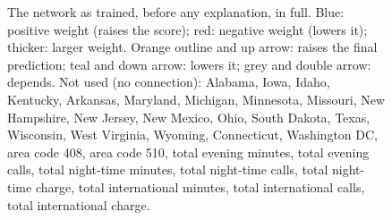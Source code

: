 \documentclass[a4paper,10pt]{article}
\newif\ifreviewmarks
\newcommand{\reviewrule}{\noindent{\color{BrickRed}\rule{\linewidth}{0.8pt}}}
\newenvironment{drafted}[1][]{%
  \ifreviewmarks\par\addvspace{\medskipamount}\reviewrule\par\nopagebreak
  \noindent{\color{BrickRed}\sffamily\footnotesize\textbf{Thesis Draft}\quad #1\hfill review}\par\nopagebreak\smallskip\fi}{%
  \ifreviewmarks\par\smallskip\noindent{\color{BrickRed}\sffamily\footnotesize end of thesis draft}\par\nopagebreak\reviewrule\par\medskip\fi}
\begin{document}
\begin{drafted}[plain-language layer: churn100-s4-c3]
\begin{landscape}
\begin{figure}[p]
{}%
\caption{The network as trained, before any explanation, in full. Blue: positive weight (raises the score); red: negative weight (lowers it); thicker: larger weight. Orange outline and up arrow: raises the final prediction; teal and down arrow: lowers it; grey and double arrow: depends. Not used (no connection): Alabama, Iowa, Idaho, Kentucky, Arkansas, Maryland, Michigan, Minnesota, Missouri, New Hampshire, New Jersey, New Mexico, Ohio, South Dakota, Texas, Wisconsin, West Virginia, Wyoming, Connecticut, Washington DC, area code 408, area code 510, total evening minutes, total evening calls, total night-time minutes, total night-time calls, total night-time charge, total international minutes, total international calls, total international charge.}
\label{fig:churn100s4c3:raw}
\end{figure}
\end{landscape}
\end{drafted}
\clearpage
\end{document}
